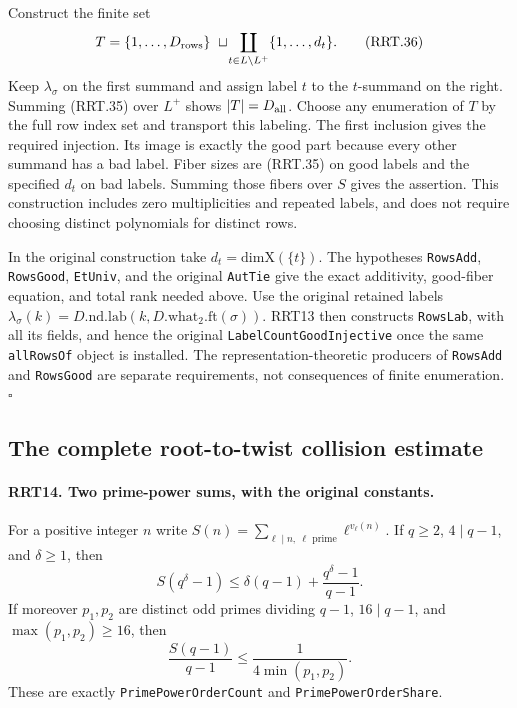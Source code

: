 \documentclass[11pt,a4paper]{article}
\numberwithin{equation}{section}
\theoremstyle{remark}\newtheorem{remark}[theorem]{Remark}
\begin{document}
Construct the finite set
\[
 T=\{1,\ldots,\allowbreak{} D_{\rm rows}\}\ \sqcup\!
            \coprod_{t\in L\setminus L^+}\{1,\ldots,\allowbreak{} d_t\}.
 \tag{RRT.36}
\]
Keep $\lambda_\sigma$ on the first summand and assign label
$t$ to the $t$-summand on the right.  Summing (RRT.35) over
$L^+$ shows $|T|=D_{\rm all}$.  Choose any enumeration of
$T$ by the full row index set and transport this labeling.
The first inclusion gives the required injection.  Its image
is exactly the good part because every other summand has a
bad label.  Fiber sizes are (RRT.35) on good labels and the
specified $d_t$ on bad labels.  Summing those fibers over $S$
gives the assertion.  This construction includes zero
multiplicities and repeated labels, and does not require
choosing distinct polynomials for distinct rows.

In the original construction take
$d_t=\mathrm{dimX}(\{t\})$.  The hypotheses
\texttt{Rows\allowbreak Add}, \texttt{Rows\allowbreak Good}, \texttt{Et\allowbreak Univ}, and
the original \texttt{Aut\allowbreak Tie} give the exact additivity,
good-fiber equation, and total rank needed above.  Use the
original retained labels
$\lambda_\sigma(k)=D.\mathrm{nd}.\mathrm{lab}(k,
D.\mathrm{what}_2.\mathrm{ft}(\sigma))$.
RRT13 then constructs \texttt{Rows\allowbreak Lab}, with all its fields,
and hence the original \texttt{Label\allowbreak Count\allowbreak Good\allowbreak Injective} once
the same \texttt{all\allowbreak Rows\allowbreak Of} object is installed.  The
representation-theoretic producers of \texttt{Rows\allowbreak Add} and
\texttt{Rows\allowbreak Good} are separate requirements, not consequences
of finite enumeration.
\hfill$\square$

\subsection{The complete root-to-twist collision estimate}

\paragraph{RRT14. Two prime-power sums, with the original constants.}
\label{claim:RRT14}
For a positive integer $n$ write
$S(n)=\sum_{\ell\mid n,\ \ell\text{ prime}}\ell^{v_\ell(n)}$.
If $q\ge2$, $4\mid q-1$, and $\delta\ge1$, then
\[
 S(q^\delta-1)\le\delta(q-1)+\frac{q^\delta-1}{q-1}.
 \tag{RRT.37}
\]
If moreover $p_1,\allowbreak{} p_2$ are distinct odd primes dividing $q-1$,
$16\mid q-1$, and $\max(p_1,\allowbreak{} p_2)\ge16$, then
\[
               \frac{S(q-1)}{q-1}
                         \le\frac1{4\min(p_1,\allowbreak{} p_2)}.
 \tag{RRT.38}
\]
These are exactly \texttt{Prime\allowbreak Power\allowbreak Order\allowbreak Count} and
\texttt{Prime\allowbreak Power\allowbreak Order\allowbreak Share}.
\end{document}
